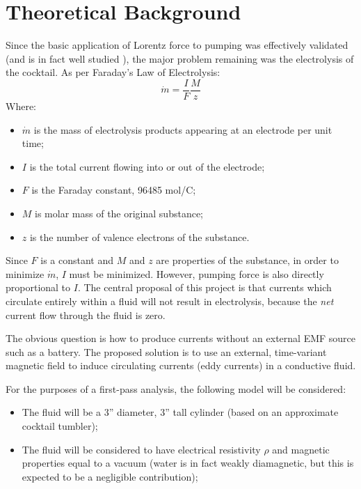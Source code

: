 \documentclass[]{article}
\begin{document}
\section{Theoretical Background}
\par Since the basic application of Lorentz force to pumping was effectively validated (and is in fact well studied \cite{yamato}), the major problem remaining was the electrolysis of the cocktail. As per Faraday's Law of Electrolysis:
\begin{equation}
\dot{m}=\frac{I}{F}\frac{M}{z}
\end{equation}
Where:
\begin{itemize}
	\item $\dot{m}$ is the mass of electrolysis products appearing at an electrode per unit time;
	\item $I$ is the total current flowing into or out of the electrode;
	\item $F$ is the Faraday constant, 96485 mol/C;
	\item $M$ is molar mass of the original substance;
	\item $z$ is the number of valence electrons of the substance.
\end{itemize}
\par Since $F$ is a constant and $M$ and $z$ are properties of the substance, in order to minimize $\dot{m}$, $I$ must be minimized. However, pumping force is also directly proportional to $I$. The central proposal of this project is that currents which circulate entirely within a fluid will not result in electrolysis, because the \textit{net} current flow through the fluid is zero. 
\par The obvious question is how to produce currents without an external EMF source such as a battery. The proposed solution is to use an external, time-variant magnetic field to induce circulating currents (eddy currents) in a conductive fluid.

\par For the purposes of a first-pass analysis, the following model will be considered:
\begin{itemize}
	\item The fluid will be a 3'' diameter, 3'' tall cylinder (based on an approximate cocktail tumbler);
	\item The fluid will be considered to have electrical resistivity $\rho$ and magnetic properties equal to a vacuum (water is in fact weakly diamagnetic, but this is expected to be a negligible contribution);
\end{itemize}
\end{document}
